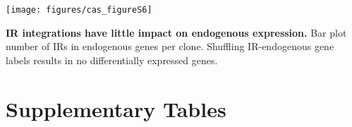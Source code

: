 \begin{suppfigure}[htbp]  
    \centering
    \texttt{[image: figures/cas\_figureS6]}
    \caption[IR integrations have little impact on endogenous expression.]{
        \textbf{IR integrations have little impact on endogenous expression.}
        Bar plot number of IRs in endogenous genes per clone.
        Shuffling IR-endogenous gene labels results in no differentially expressed genes.   
    }
    \label{fig:cas_figureS6}
\end{suppfigure}

\clearpage

\section{Supplementary Tables}

